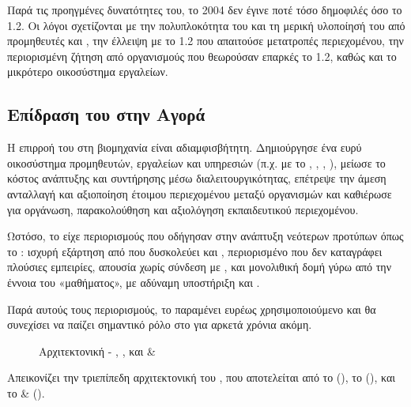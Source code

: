 Παρά τις προηγμένες δυνατότητες του, το  2004 δεν έγινε ποτέ τόσο δημοφιλές όσο το  1.2. Οι λόγοι σχετίζονται με την πολυπλοκότητα του    και τη μερική υλοποίησή του από προμηθευτές  και  , την έλλειψη   με το  1.2 που απαιτούσε μετατροπές περιεχομένου, την περιορισμένη ζήτηση από οργανισμούς που θεωρούσαν επαρκές το  1.2, καθώς και το μικρότερο οικοσύστημα εργαλείων.

\subsection{Επίδραση του  στην Αγορά }
\label{subsec:scorm_market_impact}

Η επιρροή του  στη βιομηχανία  είναι αδιαμφισβήτητη. Δημιούργησε ένα ευρύ οικοσύστημα προμηθευτών, εργαλείων και υπηρεσιών (π.χ.   με το  , , , ), μείωσε το κόστος ανάπτυξης και συντήρησης μέσω διαλειτουργικότητας, επέτρεψε την άμεση ανταλλαγή και αξιοποίηση έτοιμου περιεχομένου μεταξύ οργανισμών και καθιέρωσε   για οργάνωση, παρακολούθηση και αξιολόγηση εκπαιδευτικού περιεχομένου.

Ωστόσο, το  είχε περιορισμούς που οδήγησαν στην ανάπτυξη νεότερων προτύπων όπως το : ισχυρή εξάρτηση από   που δυσκολεύει   και , περιορισμένο   που δεν καταγράφει πλούσιες εμπειρίες, απουσία   χωρίς σύνδεση με , και μονολιθική δομή γύρω από την έννοια του «μαθήματος», με αδύναμη υποστήριξη  και  .

Παρά αυτούς τους περιορισμούς, το  παραμένει ευρέως χρησιμοποιούμενο και θα συνεχίσει να παίζει σημαντικό ρόλο στο  για αρκετά χρόνια ακόμη.


\begin{figure}[H]
  \centering
  
  \caption{Αρχιτεκτονική  - , , και  \& }
  \label{fig:scorm_architecture}
\end{figure}

Απεικονίζει την τριεπίπεδη αρχιτεκτονική του , που αποτελείται από το    (), το   (), και το  \&  ().


